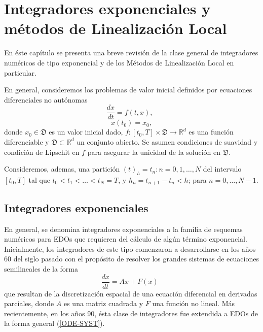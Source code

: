 \chapter{Integradores exponenciales y m\'{e}todos de Linealizaci\'{o}n Local }\label{chapter:REV-LL}

En \'este capítulo se presenta una breve revisión de la clase general de  integradores numéricos de tipo exponencial y de los M\'{e}todos de Linealizaci\'{o}n Local en particular. 

En general, consideremos los problemas de valor inicial definidos por ecuaciones diferenciales no aut\'onomas
 \begin{equation}
 \frac{dx}{dt}=f(t,x), \;\; \label{ODE-SYST}
 \end{equation}
 \begin{equation*}
 x(t_0)=x_0,
 \end{equation*}
 donde $x_0\in \mathfrak{D}$ es un valor inicial dado, $f: [t_0,T] \times \mathfrak{D}\longrightarrow \mathbb{R}^{d}$ es una función diferenciable y $\mathfrak{D}\subset\mathbb{R}^{d}$ un conjunto abierto. Se asumen condiciones de suavidad y condición de Lipschit en $f$ para asegurar la unicidad de la solución en $\mathfrak{D}$.

Consideremos, ademas, una partici\'{o}n $(t)_{h}={t_{n}:n=0,1,\ldots,N}$ del
intervalo $[t_{0},T]$ tal que $t_{0}<t_{1}<\ldots<t_{N}=T$, y $%
h_{n}=t_{n+1}-t_{n}<h$; para $n=0,\ldots,N-1$.


\section{Integradores exponenciales\label{section:EXPO-INTEG}}

En general, se denomina integradores exponenciales a la familia
de esquemas num\'ericos para EDOs que requieren del c\'alculo de alg\'un t\'ermino exponencial. Inicialmente, los integradores de este tipo comenzaron a desarrollarse en los a\~nos 60 del siglo pasado con el prop\'osito de resolver los grandes sistemas de ecuaciones semilineales de la
forma
\begin{equation}
\frac{dx}{dt} = Ax + F(x)  \;\;  \label{ODE Lines Method}
\end{equation}
que resultan de la discretizaci\'on espacial de una ecuaci\'on diferencial en derivadas parciales, donde $A$ es una
matriz cuadrada y $F$ una funci\'on no lineal. M\'as recientemente, en los a\~nos 90, \'esta clase de integradores fue extendida a EDOs de la forma general (\ref{ODE-SYST}). 

